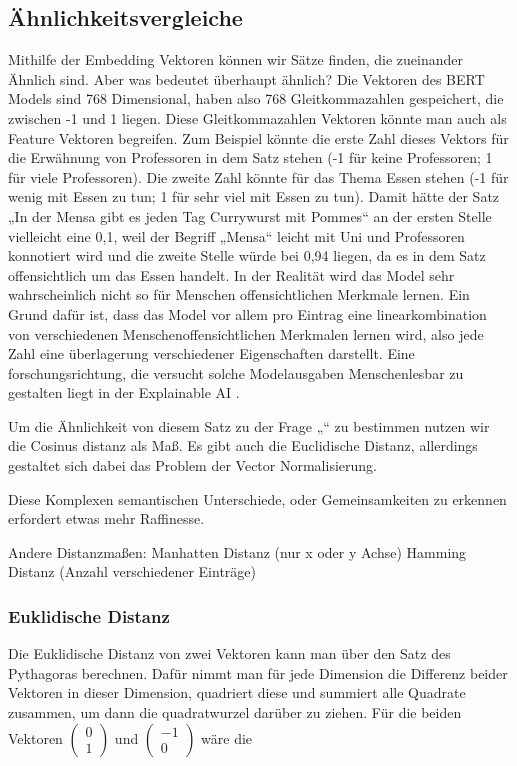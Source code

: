 \subsection{Ähnlichkeitsvergleiche}

Mithilfe der Embedding Vektoren können wir Sätze finden, die zueinander Ähnlich sind. 
Aber was bedeutet überhaupt ähnlich? 
Die Vektoren des BERT Models sind 768 Dimensional, haben also 768 Gleitkommazahlen gespeichert, die zwischen -1 und 1 liegen. 
Diese Gleitkommazahlen Vektoren könnte man auch als Feature Vektoren begreifen. 
Zum Beispiel könnte die erste Zahl dieses Vektors für die Erwähnung von Professoren in dem Satz stehen (-1 für keine Professoren; 1 für viele Professoren). 
Die zweite Zahl könnte für das Thema Essen stehen (-1 für wenig mit Essen zu tun; 1 für sehr viel mit Essen zu tun). 
Damit hätte der Satz „In der Mensa gibt es jeden Tag Currywurst mit Pommes“ an der ersten Stelle vielleicht eine 0,1, weil der Begriff „Mensa“ leicht mit Uni und Professoren konnotiert wird und die zweite Stelle würde bei 0,94 liegen, da es in dem Satz offensichtlich um das Essen handelt. 
In der Realität wird das Model sehr wahrscheinlich nicht so für Menschen offensichtlichen Merkmale lernen. Ein Grund dafür ist, dass das Model vor allem pro Eintrag eine linearkombination von verschiedenen Menschenoffensichtlichen Merkmalen lernen wird, also jede Zahl eine überlagerung verschiedener Eigenschaften darstellt. 
Eine forschungsrichtung, die versucht solche Modelausgaben Menschenlesbar zu gestalten liegt in der Explainable AI \cite{hassija2024}.

Um die Ähnlichkeit von diesem Satz zu der Frage „“ zu bestimmen nutzen wir die Cosinus distanz als Maß. 
Es gibt auch die Euclidische Distanz, allerdings gestaltet sich dabei das Problem der Vector Normalisierung.


Diese Komplexen semantischen Unterschiede, oder Gemeinsamkeiten zu erkennen erfordert etwas mehr Raffinesse.

Andere Distanzmaßen:
Manhatten Distanz (nur x oder y Achse)
Hamming Distanz (Anzahl verschiedener Einträge)

\subsubsection{Euklidische Distanz}

Die Euklidische Distanz von zwei Vektoren kann man über den Satz des Pythagoras berechnen.
Dafür nimmt man für jede Dimension die Differenz beider Vektoren in dieser Dimension, quadriert diese und summiert alle Quadrate zusammen, um dann die quadratwurzel darüber zu ziehen.
Für die beiden Vektoren 
$\begin{pmatrix}0\\1\end{pmatrix}$
und 
$\begin{pmatrix}-1\\0\end{pmatrix}$
wäre die

